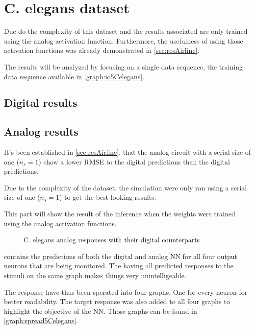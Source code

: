 \section{\acs{C. elegans} dataset}
\label{sec:resCelegans}

Due do the complexity of this dataset and the results associated are only trained using the analog activation function. Furthermore, the usefulness of using those activation functions was already demonstrated in \cref{sec:resAirline}.

The results will be analyzed by focusing on a single data sequence, the training data sequence available in \cref{graph:io5Celegans}.

\subsection{Digital results}
\label{subsec:digitalCelegans}

\subsection{Analog results}
\label{subsec:analogCelegans}

It's been established in \cref{sec:resAirline}, that the analog circuit with a serial size of one ($n_s=1$) show a lower \ac{RMSE} to the digital predictions than the digital predictions.

Due to the complexity of the dataset, the simulation were only ran using a serial size of one ($n_s=1$) to get the best looking results.

This part will show the result of the inference when the weights were trained using the analog activation functions.

\begin{figure}[H]
  \centering
  
  \caption{\acs{C. elegans} analog responses with their digital counterparts}
  \label{graph:celegansAnalog0}
\end{figure}

 contains the predictions of both the digital and analog \ac{NN} for all four output neurons that are being monitored. The having all predicted responses to the stimuli on the same graph makes things very unintelligeable.

The response have thus been sperated into four graphs. One for every neuron for better readability. The target response was also added to all four graphs to highlight the objective of the \ac{NN}. Those graphs can be found in \cref{graph:spread5Celegans}.

